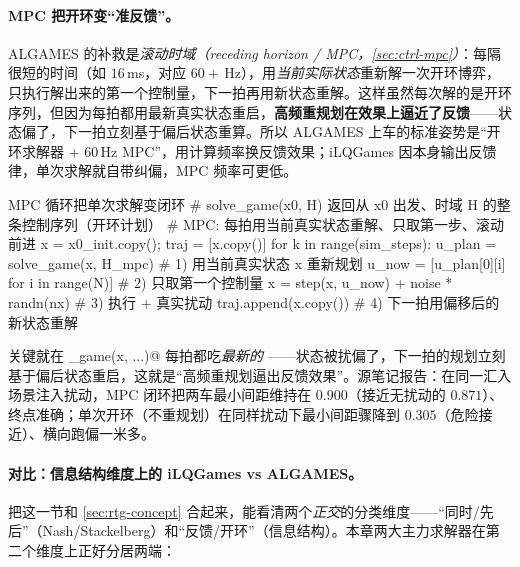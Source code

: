 \paragraph{MPC 把开环变“准反馈”。}
ALGAMES 的补救是\emph{滚动时域（receding horizon / MPC，\cref{sec:ctrl-mpc}）}：每隔很短的时间（如 $16$\,ms，对应 $60+$\,Hz），用\emph{当前实际状态}重新解一次开环博弈，只执行解出来的第一个控制量，下一拍再用新状态重解。这样虽然每次解的是开环序列，但因为每拍都用最新真实状态重启，\textbf{高频重规划在效果上逼近了反馈}——状态偏了，下一拍立刻基于偏后状态重算。所以 ALGAMES 上车的标准姿势是“开环求解器 + $60$\,Hz MPC”，用计算频率换反馈效果；iLQGames 因本身输出反馈律，单次求解就自带纠偏，MPC 频率可更低。

\begin{codebox}[Python]{MPC 循环把单次求解变闭环}
# solve_game(x0, H) 返回从 x0 出发、时域 H 的整条控制序列（开环计划）
# MPC: 每拍用当前真实状态重解、只取第一步、滚动前进
x = x0_init.copy(); traj = [x.copy()]
for k in range(sim_steps):
    u_plan = solve_game(x, H_mpc)               # 1) 用当前真实状态 x 重新规划
    u_now  = [u_plan[0][i] for i in range(N)]   # 2) 只取第一个控制量
    x = step(x, u_now) + noise * randn(nx)      # 3) 执行 + 真实扰动
    traj.append(x.copy())                       # 4) 下一拍用偏移后的新状态重解
\end{codebox}

\noindent 关键就在 \verb@solve_game(x, ...)@ 每拍都吃\emph{最新的} \verb@x@——状态被扰偏了，下一拍的规划立刻基于偏后状态重启，这就是“高频重规划逼出反馈效果”。源笔记报告：在同一汇入场景注入扰动，MPC 闭环把两车最小间距维持在 $0.900$（接近无扰动的 $0.871$）、终点准确；单次开环（不重规划）在同样扰动下最小间距骤降到 $0.305$（危险接近）、横向跑偏一米多\cite{lecleach2022algames}。

\paragraph{对比：信息结构维度上的 iLQGames vs ALGAMES。}
把这一节和 \cref{sec:rtg-concept} 合起来，能看清两个\emph{正交}的分类维度——“同时/先后”（Nash/Stackelberg）和“反馈/开环”（信息结构）。本章两大主力求解器在第二个维度上正好分居两端：

